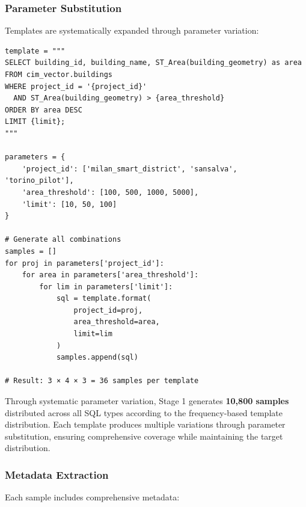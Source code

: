 \subsubsection{Parameter Substitution}

Templates are systematically expanded through parameter variation:

\begin{lstlisting}[style=pythonstyle, caption=Template parameter substitution]
template = """
SELECT building_id, building_name, ST_Area(building_geometry) as area
FROM cim_vector.buildings
WHERE project_id = '{project_id}'
  AND ST_Area(building_geometry) > {area_threshold}
ORDER BY area DESC
LIMIT {limit};
"""

parameters = {
    'project_id': ['milan_smart_district', 'sansalva', 'torino_pilot'],
    'area_threshold': [100, 500, 1000, 5000],
    'limit': [10, 50, 100]
}

# Generate all combinations
samples = []
for proj in parameters['project_id']:
    for area in parameters['area_threshold']:
        for lim in parameters['limit']:
            sql = template.format(
                project_id=proj, 
                area_threshold=area, 
                limit=lim
            )
            samples.append(sql)

# Result: 3 × 4 × 3 = 36 samples per template
\end{lstlisting}

Through systematic parameter variation, Stage 1 generates \textbf{10,800 samples} distributed across all SQL types according to the frequency-based template distribution. Each template produces multiple variations through parameter substitution, ensuring comprehensive coverage while maintaining the target distribution.

\subsubsection{Metadata Extraction}

Each sample includes comprehensive metadata:

